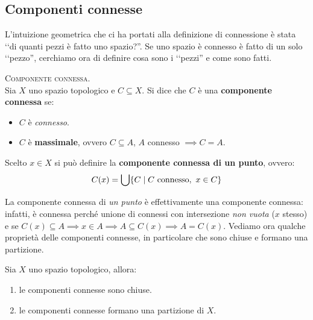 \subsection{Componenti connesse}
L'intuizione geometrica che ci ha portati alla definizione di connessione è stata ‘‘di quanti pezzi è fatto uno spazio?''. Se uno spazio è connesso è fatto di un solo ‘‘pezzo'', cerchiamo ora di definire cosa sono i ‘‘pezzi'' e come sono fatti.
\begin{define}\textsc{Componente connessa.}\\
	Sia $X$ uno spazio topologico e $C\subseteq X$. Si dice che $C$ è una \textbf{componente connessa} se: 
		\begin{itemize}
			\item $C$ è \textit{connesso}.
			\item $C$ è \textbf{massimale}, ovvero $C\subseteq A$, $A$ connesso $\implies C=A$.
		\end{itemize}
	Scelto $x\in X$ si può definire la \textbf{componente connessa di un punto}, ovvero:
	\begin{equation}
		\displaystyle C(x)=\mathop{{\bigcup}}\displaylimits \{C \mid C\text{ connesso},\ x\in C\}
	\end{equation}
\vspace{-6mm}
\end{define}
La componente connessa di \textit{un punto} è effettivamente una componente connessa: infatti, è connessa perché unione di connessi con intersezione \textit{non vuota} ($x$ stesso) e se $C(x)\subseteq A \implies x\in A \implies A\subseteq C(x) \implies A=C(x)$.\newline
Vediamo ora qualche proprietà delle componenti connesse, in particolare che sono chiuse e formano una partizione.
\begin{theorema}
	Sia $X$ uno spazio topologico, allora:
		\begin{enumerate}
			\item le componenti connesse sono chiuse.
			\item le componenti connesse formano una partizione di $X$.
		\end{enumerate}
	\vspace{-3mm}
\end{theorema}
